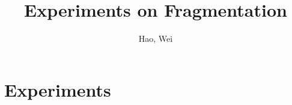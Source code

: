 \documentclass{article}
\begin{document}
\title{Experiments on Fragmentation}
\author{Hao, Wei}
\maketitle
\newpage

\tableofcontents
\newpage

\section{Experiments}





\begin{appendix}  





 
\end{appendix} 
\end{document}
